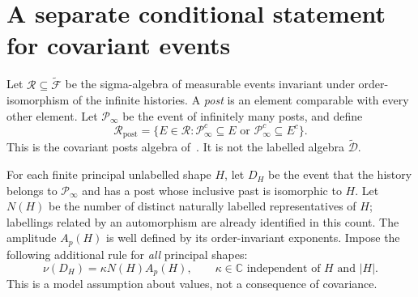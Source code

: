 \documentclass[11pt]{article}
\theoremstyle{definition}
\newcommand{\F}{\widetilde{\mathcal F}}
\newcommand{\D}{\widetilde{\mathcal D}}
\newcommand{\Rp}{\mathcal R_{\mathrm{post}}}
\newcommand{\Pinfty}{\mathcal P_\infty}
\begin{document}
\section{A separate conditional statement for covariant events}
Let $\mathcal R\subseteq\F$ be the sigma-algebra of measurable events
invariant under order-isomorphism of the infinite histories. A \emph{post}
is an element comparable with every other element. Let $\Pinfty$ be the
event of infinitely many posts, and define
\begin{equation}\label{eq:posts-algebra}
 \Rp=\{E\in\mathcal R:
   \Pinfty^c\subseteq E\text{ or }\Pinfty^c\subseteq E^c\}.
\end{equation}
This is the covariant posts algebra of~\cite[Sec.~V, Eq.~(29)]{DZ}.
It is not the labelled algebra $\D$.

For each finite principal unlabelled shape $H$, let $D_H$ be the event that
the history belongs to $\Pinfty$ and has a post whose inclusive past is
isomorphic to $H$. Let $N(H)$ be the number of distinct naturally labelled
representatives of $H$; labellings related by an automorphism are already
identified in this count. The amplitude $A_p(H)$ is well defined by its
order-invariant exponents. Impose the following additional rule for
\emph{all} principal shapes:
\begin{equation}\tag{T}\label{eq:T}
 \nu(D_H)=\kappa N(H)A_p(H),\qquad
 \kappa\in\mathbb C\text{ independent of }H\text{ and }|H|.
\end{equation}
This is a model assumption about values, not a consequence of covariance.
\end{document}
